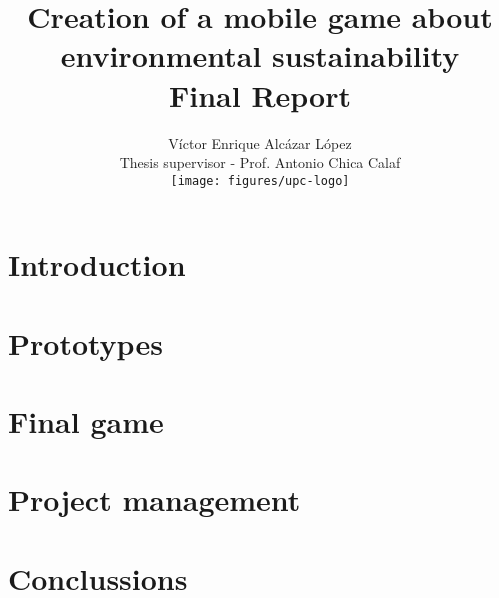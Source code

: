 

\title{Creation of a mobile game about environmental sustainability \\
 \large Final Report}

\author{Víctor Enrique Alcázar López \\
	Thesis supervisor - Prof. Antonio Chica Calaf \\
	\texttt{[image: figures/upc-logo]}
}




\maketitle
\tableofcontents




\chapter{Introduction}






\chapter{Prototypes}





\chapter{Final game}
\label{chap:final-game}





\chapter{Project management}




\chapter{Conclussions}


\printglossary[type=\acronymtype]
\printglossary





